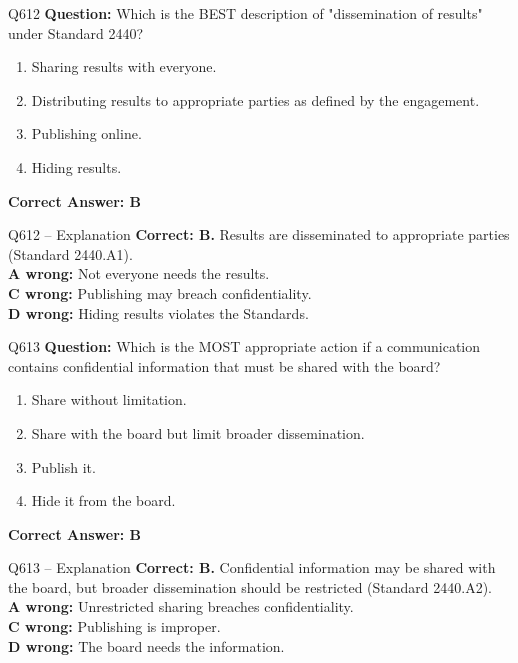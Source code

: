 \documentclass[aspectratio=169,10pt]{beamer}
\begin{document}
	\begin{frame}[t]{Q612}
		\small
		\textbf{Question:} Which is the BEST description of "dissemination of results" under Standard 2440?
		\begin{enumerate}[label=\Alph*.,itemsep=1pt,topsep=2pt]
			\item Sharing results with everyone.
			\item Distributing results to appropriate parties as defined by the engagement.
			\item Publishing online.
			\item Hiding results.
		\end{enumerate}
		\vspace{4pt}
		\textbf{Correct Answer: B}
	\end{frame}
	
	\begin{frame}[t]{Q612 -- Explanation}
		\small
		\textbf{Correct: B.} Results are disseminated to appropriate parties (Standard 2440.A1). \\[4pt]
		\textbf{A wrong:} Not everyone needs the results. \\[2pt]
		\textbf{C wrong:} Publishing may breach confidentiality. \\[2pt]
		\textbf{D wrong:} Hiding results violates the Standards.
	\end{frame}
	
	\begin{frame}[t]{Q613}
		\small
		\textbf{Question:} Which is the MOST appropriate action if a communication contains confidential information that must be shared with the board?
		\begin{enumerate}[label=\Alph*.,itemsep=1pt,topsep=2pt]
			\item Share without limitation.
			\item Share with the board but limit broader dissemination.
			\item Publish it.
			\item Hide it from the board.
		\end{enumerate}
		\vspace{4pt}
		\textbf{Correct Answer: B}
	\end{frame}
	
	\begin{frame}[t]{Q613 -- Explanation}
		\small
		\textbf{Correct: B.} Confidential information may be shared with the board, but broader dissemination should be restricted (Standard 2440.A2). \\[4pt]
		\textbf{A wrong:} Unrestricted sharing breaches confidentiality. \\[2pt]
		\textbf{C wrong:} Publishing is improper. \\[2pt]
		\textbf{D wrong:} The board needs the information.
	\end{frame}
	
\end{document}

